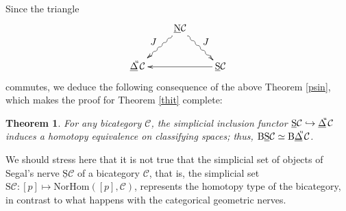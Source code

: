 \documentclass[]{amsart}
\newtheorem{theorem}{Theorem}[section]
\begin{document}
Since the triangle  $$\xymatrix{&{\ensuremath{\underline{\mathrm{N}}}}{\ensuremath{\mathcal{C}}}\ar@{~>}[dr]^{\textstyle J}\ar@{~>}[dl]_{\textstyle
J}&\\{\ensuremath{\underline{\Delta}}}\hspace{-3pt}^{^\mathrm{u}}{\ensuremath{\mathcal{C}}}&&\underline{\mathrm{S}}{\ensuremath{\mathcal{C}}} \ar@{->}[ll]}$$ commutes, we
deduce the following consequence of the above Theorem \ref{psin}, which makes the proof for Theorem
\ref{thit} complete:
\begin{theorem}
For any bicategory ${\ensuremath{\mathcal{C}}}$, the simplicial inclusion functor $\underline{\mathrm{S}}{\ensuremath{\mathcal{C}}}\hookrightarrow
{\ensuremath{\underline{\Delta}}}\hspace{-3pt}^{^\mathrm{u}}{\ensuremath{\mathcal{C}}}$ induces a homotopy equivalence on classifying spaces; thus,
${\ensuremath{\mathrm{B}}} \underline{\mathrm{S}}{\ensuremath{\mathcal{C}}}\simeq {\ensuremath{\mathrm{B}}}{\ensuremath{\underline{\Delta}}}\hspace{-3pt}^{^\mathrm{u}}{\ensuremath{\mathcal{C}}}$.
\end{theorem}

We should stress here that it is not true that the simplicial set of objects of Segal's nerve
 $\underline{\mathrm{S}}{\ensuremath{\mathcal{C}}}$ of a bicategory ${\ensuremath{\mathcal{C}}}$, that is, the simplicial set
  ${\mathrm S}{\ensuremath{\mathcal{C}}}:[p]\mapsto \mathrm{NorHom}([p],{\ensuremath{\mathcal{C}}})$, represents the homotopy type of the bicategory, in contrast
  to what happens with the categorical geometric nerves.
\end{document}
